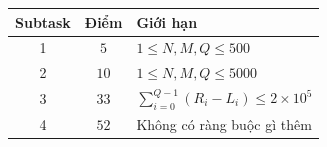 \begin{center}
  \begin{tabular}{|c|c|l|} \hline
    \textbf{Subtask} & \textbf{Điểm} & \textbf{Giới hạn} \\ \hline
    1 & $5$  & $1\le N, M, Q \le 500$ \\ \hline
    2 & $10$ & $1\le N, M, Q \le 5000$ \\ \hline
    3 & $33$ & $\sum_{i=0}^{Q-1} (R_i-L_i) \le 2\times 10^5$ \\ \hline
    4 & $52$ & Không có ràng buộc gì thêm \\ \hline
  \end{tabular}
\end{center}
